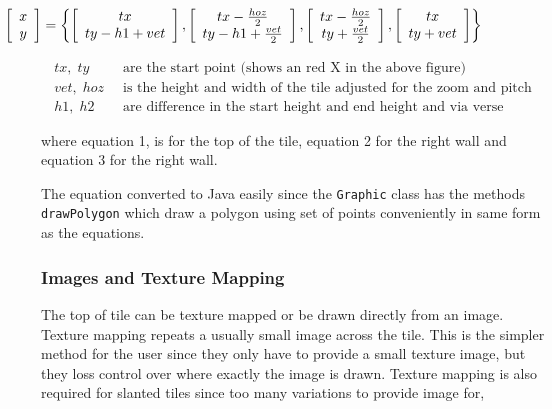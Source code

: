 \begin{equation}
\hspace{-2.5cm} \left[ \begin{array}{c} x \\ y \end{array} \right]=\left\{ \left[ \begin{array}{c} tx \\ ty-h1+vet \end{array} \right],\left[ \begin{array}{c} tx-\frac{hoz}{2} \\ ty-h1+\frac{vet}{2} \end{array} \right],\left[ \begin{array}{c} tx-\frac{hoz}{2} \\ ty+\frac{vet}{2} \end{array} \right],\left[ \begin{array}{c} tx \\ ty+vet \end{array} \right] \right\}
\end{equation}

\begin{align*}
	tx,\; ty   &\;\; \textrm{are the start point (shows an red X in the above figure)}\\
	vet,\; hoz &\;\; \textrm{is the height and width of the tile adjusted for  the zoom and pitch}\\
	h1,\; h2   &\;\; \textrm{are difference in the start height and end height and via verse}
\end{align*}

where equation 1, is for the top of the tile, equation 2 for the right wall and equation 3 for the right wall. 

The equation converted to Java easily since the \texttt{Graphic} class has the methods  \texttt{drawPolygon} which draw a polygon using set of points conveniently in same form as the equations.

\subsubsection{Images and Texture Mapping}
The top of tile can be texture mapped or be drawn directly from an image.  Texture mapping repeats a usually small image across the tile. This is the simpler method for the user since they only have to provide a small texture image, but they loss control over where exactly the image is drawn.  Texture mapping is also required for slanted tiles since too many variations to provide image for,

